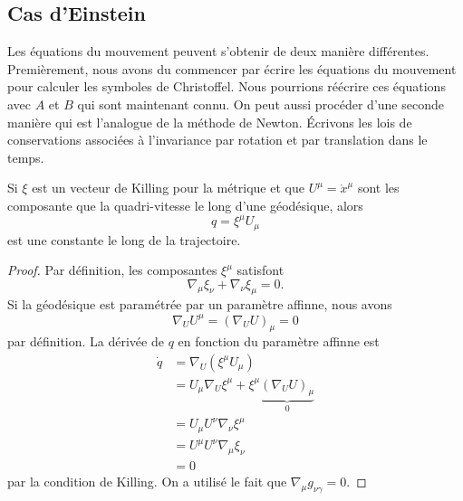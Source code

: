 \documentclass[a4paper,11pt]{report}
\begin{document}
        
        
        \subsection{Cas d'Einstein}
        
            Les équations du mouvement peuvent s'obtenir de deux manière différentes. Premièrement, nous avons du commencer par écrire les équations du mouvement pour calculer les symboles de Christoffel. Nous pourrions réécrire ces équations avec $A$ et $B$ qui sont maintenant connu. On peut aussi procéder d'une seconde manière qui est l'analogue de la méthode de Newton. Écrivons les lois de conservations associées à l'invariance par rotation et par translation dans le temps.
            
            \begin{prop}\begin{leftbar}
                Si $\xi$ est un vecteur de Killing pour la métrique et que $U^\mu = \dot{x}^\mu$ sont les composante que la quadri-vitesse le long d'une géodésique, alors
                \begin{equation}
                    q = \xi^\mu U_\mu
                \end{equation}
                est une constante le long de la trajectoire.
            \end{leftbar}\end{prop}
            
            \begin{proof}
                Par définition, les composantes $\xi^\mu$ satisfont
                \begin{equation}
                    \nabla_\mu\xi_\nu + \nabla_\nu\xi_\mu = 0.
                \end{equation}
                Si la géodésique est paramétrée par un paramètre affinne, nous avons 
                \begin{equation}
                    \nabla_U U^\mu = (\nabla_U U)_\mu = 0
                \end{equation}
                par définition. La dérivée de $q$ en fonction du paramètre affinne  est
                \begin{align}
                    \dot{q} &= \nabla_U(\xi^\mu U_\mu)\\
                    &= U_\mu\nabla_U \xi^\mu + \xi^\mu\underbrace{(\nabla_U U)_\mu}_{0}\\
                    &= U_\mu U^\nu\nabla_\nu \xi^\mu\\
                    &= U^\mu U^\nu \nabla_\mu \xi_\nu\\
                    &= 0
                \end{align}
                par la condition de Killing. On a utilisé le fait que $\nabla_\mu g_{\nu\gamma} = 0$.
            \end{proof}
            
\end{document}
